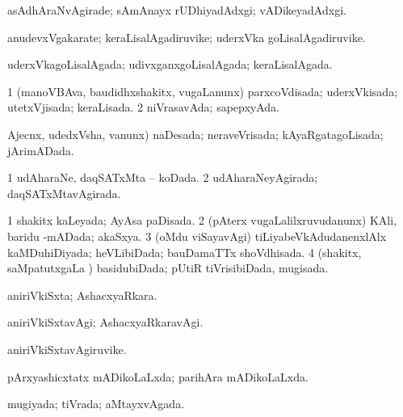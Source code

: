 {\bentry
{} 
\gl{\kirxvi}
\expl{}
\bmng
 asAdhAraNvAgirade; sAmAnayx rUDhiyadAdxgi; vADikeyadAdxgi. 
\emng
\eentry

\bentry
{} 
\gl{\nA}
\expl{}
\bmng
 anudevxVgakarate; keraLisalAgadiruvike; uderxVka goLisalAgadiruvike. 
\emng
\eentry

\bentry
{} 
\gl{\gu}
\expl{}
\bmng
 uderxVkagoLisalAgada; udivxganxgoLisalAgada; keraLisalAgada. 
\emng
\eentry

\bentry
{} 
\gl{\gu}
\expl{}
\bmng
\bnum
\num{1} (manoVBAva, baudidhxshakitx, \mo vugaLanunx) parxcoVdisada; uderxVkisada; utetxVjisada; keraLisada. 
\num{2} niVrasavAda; sapepxyAda. 
\enum
\emng
\eentry

\bentry
{} 
\gl{\gu}
\expl{}
\bmng
 \eng{(} Ajecnx, udedxVsha, \mo vanunx) naDesada; neraveVrisada; kAyaRgatagoLisada; jArimADada. 
\emng
\eentry

\bentry
{} 
\gl{\gu}
\expl{}
\bmng
\bnum
\num{1} udAharaNe, daqSATxMta -- koDada. 
\num{2} udAharaNeyAgirada; daqSATxMtavAgirada. 
\enum
\emng
\eentry

\bentry
{} 
\gl{\gu}
\expl{}
\bmng
\bnum
\num{1} shakitx kaLeyada; AyAsa paDisada. 
\num{2} (pAterx \mo vugaLalilxruvudanunx) KAli, baridu -mADada; akaSxya. 
\num{3} (oMdu viSayavAgi) tiLiyabeVkAdudanenxlAlx kaMDuhiDiyada; heVLibiDada; bauDamaTTx shoVdhisada. 
\num{4} (shakitx, saMpatutxgaLa \vi) basidubiDada; pUtiR tiVrisibiDada, mugisada. 
\enum
\emng
\eentry

\bentry
{} 
\gl{\gu}
\expl{}
\bmng
 aniriVkiSxta; AshacxyaRkara. 
\emng
\eentry

\bentry
{} 
\gl{\kirxvi}
\expl{}
\bmng
 aniriVkiSxtavAgi; AshacxyaRkaravAgi. 
\emng
\eentry

\bentry
{} 
\gl{\nA}
\expl{}
\bmng
 aniriVkiSxtavAgiruvike. 
\emng
\eentry

\bentry
{} 
\gl{\gu}
\expl{}
\bmng
 pArxyashicxtatx mADikoLaLxda; parihAra mADikoLaLxda. 
\emng
\eentry

\bentry
{} 
\gl{\gu}
\expl{}
\bmng
 mugiyada; tiVrada; aMtayxvAgada. 
\emng
\eentry

}
